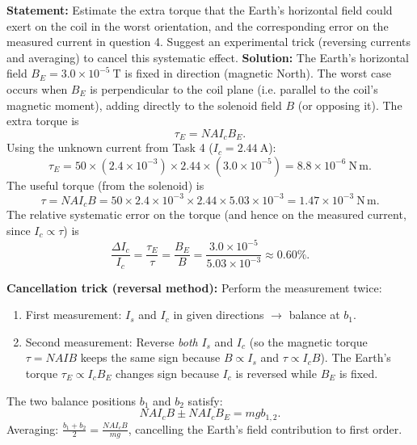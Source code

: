 \documentclass[11pt]{article}
\begin{document}
\begin{exoresolu}
\textbf{Statement:} Estimate the extra torque that the Earth's horizontal field could exert on the coil in the worst orientation, and the corresponding error on the measured current in question 4. Suggest an experimental trick (reversing currents and averaging) to cancel this systematic effect.
\tcblower
\textbf{Solution:}
The Earth's horizontal field $B_E = 3.0 \times 10^{-5}\ \mathrm{T}$ is fixed in direction (magnetic North). The worst case occurs when $B_E$ is perpendicular to the coil plane (i.e. parallel to the coil's magnetic moment), adding directly to the solenoid field $B$ (or opposing it). The extra torque is
\[
\tau_E = N A I_c B_E.
\]
Using the unknown current from Task 4 ($I_c = 2.44\ \mathrm{A}$):
\[
\tau_E = 50 \times (2.4 \times 10^{-3}) \times 2.44 \times (3.0 \times 10^{-5})
= 8.8 \times 10^{-6}\ \mathrm{N\,m}.
\]
The useful torque (from the solenoid) is
\[
\tau = N A I_c B = 50 \times 2.4 \times 10^{-3} \times 2.44 \times 5.03 \times 10^{-3}
= 1.47 \times 10^{-3}\ \mathrm{N\,m}.
\]
The relative systematic error on the torque (and hence on the measured current, since $I_c \propto \tau$) is
\[
\frac{\Delta I_c}{I_c} = \frac{\tau_E}{\tau} = \frac{B_E}{B}
= \frac{3.0 \times 10^{-5}}{5.03 \times 10^{-3}} \approx 0.60\%.
\]

\textbf{Cancellation trick (reversal method):}
Perform the measurement twice:
\begin{enumerate}
\item First measurement: $I_s$ and $I_c$ in given directions $\to$ balance at $b_1$.
\item Second measurement: Reverse \emph{both} $I_s$ and $I_c$ (so the magnetic torque $\tau = NAIB$ keeps the same sign because $B \propto I_s$ and $\tau \propto I_c B$). The Earth's torque $\tau_E \propto I_c B_E$ changes sign because $I_c$ is reversed while $B_E$ is fixed.
\end{enumerate}
The two balance positions $b_1$ and $b_2$ satisfy:
\[
NAI_c B \pm NAI_c B_E = mgb_{1,2}.
\]
Averaging: $\frac{b_1 + b_2}{2} = \frac{NAI_c B}{mg}$, cancelling the Earth's field contribution to first order.
\end{exoresolu}
\end{document}

